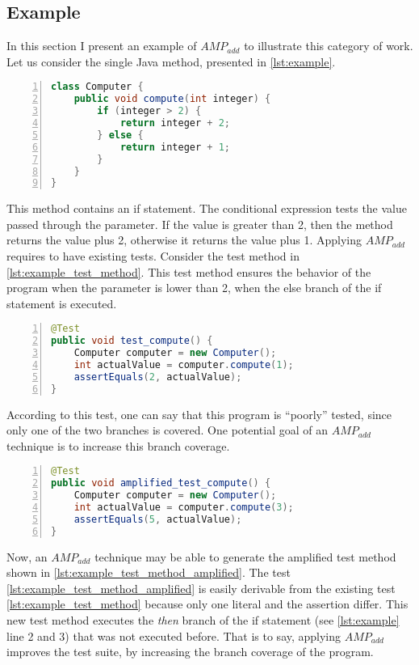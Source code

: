 \subsection{Example}
\label{subsec:sota:category-1:example}

In this section I present an example of $AMP_{add}$ to illustrate this category of work.
Let us consider the single Java method, presented in \autoref{lst:example}.

\begin{lstlisting}[caption={Example of a toy method},label=lst:example,float,language=java,numbers=left]
class Computer {
	public void compute(int integer) {
		if (integer > 2) {
			return integer + 2;
		} else {
			return integer + 1;
		}
	}
}
\end{lstlisting}

This method contains an if statement. 
The conditional expression tests the value passed through the parameter. 
If the value is greater than 2, then the method returns the value plus 2, otherwise it returns the value plus 1.
Applying $AMP_{add}$ requires to have existing tests. 
Consider the test method in \autoref{lst:example_test_method}.
This test method ensures the behavior of the program when the parameter is lower than 2, \ie when the else branch of the if statement is executed.

\begin{lstlisting}[caption={Example of toy test method},label=lst:example_test_method,float,language=java,numbers=left] 
@Test
public void test_compute() {
	Computer computer = new Computer();
	int actualValue = computer.compute(1);
	assertEquals(2, actualValue);
}
\end{lstlisting}

According to this test, one can say that this program is ``poorly'' tested, since only one of the two branches is covered.
One potential goal of an $AMP_{add}$ technique is to increase this branch coverage. 

\begin{lstlisting}[caption={Example of amplified toy test method},label=lst:example_test_method_amplified,float,language=java,numbers=left] 
@Test
public void amplified_test_compute() {
	Computer computer = new Computer();
	int actualValue = computer.compute(3);
	assertEquals(5, actualValue);
}
\end{lstlisting}

Now, an $AMP_{add}$ technique may be able to generate the amplified test method shown in \autoref{lst:example_test_method_amplified}.
The test \autoref{lst:example_test_method_amplified} is easily derivable from the existing test \autoref{lst:example_test_method} because only one literal and the assertion differ.
This new test method executes the \textit{then} branch of the if statement (see \autoref{lst:example} line 2 and 3) that was not executed before. 
That is to say, applying $AMP_{add}$ improves the test suite, by increasing the branch coverage of the program.